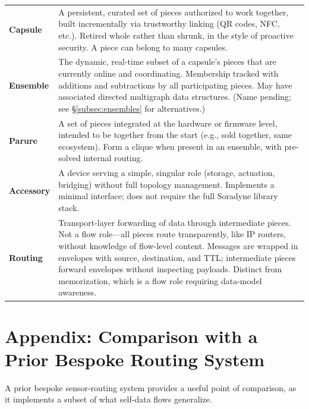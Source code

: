 \documentclass[11pt, letterpaper]{article}
\begin{document}
\begin{center}
\begin{longtable}{l p{10cm}}
\textbf{Capsule} &
  A persistent, curated set of pieces authorized to work together, built incrementally
  via trustworthy linking (QR codes, NFC, etc.). Retired whole rather than shrunk, in the
  style of proactive security. A piece can belong to many capsules. \\[6pt]

\textbf{Ensemble} &
  The dynamic, real-time subset of a capsule's pieces that are currently online and
  coordinating. Membership tracked with additions and subtractions by all participating
  pieces. May have associated directed multigraph data structures. (Name pending; see
  \S\ref{subsec:ensembles} for alternatives.) \\[6pt]

\textbf{Parure} &
  A set of pieces integrated at the hardware or firmware level, intended to be together
  from the start (e.g., sold together, same ecosystem). Form a clique when present in an
  ensemble, with pre-solved internal routing. \\[6pt]

\textbf{Accessory} &
  A device serving a simple, singular role (storage, actuation, bridging) without
  full topology management. Implements a minimal interface; does not require the full
  Soradyne library stack. \\[6pt]

\textbf{Routing} &
  Transport-layer forwarding of data through intermediate pieces. Not a flow role---all
  pieces route transparently, like IP routers, without knowledge of flow-level content.
  Messages are wrapped in envelopes with source, destination, and TTL; intermediate
  pieces forward envelopes without inspecting payloads.
  Distinct from memorization, which is a flow role requiring data-model awareness. \\[6pt]

\bottomrule
\end{longtable}
\end{center}


\newpage
\section{Appendix: Comparison with a Prior Bespoke Routing System}
\label{sec:appendix-twigs}

A prior bespoke sensor-routing system provides a useful point of comparison, as it
implements a subset of what self-data flows generalize.
\end{document}
